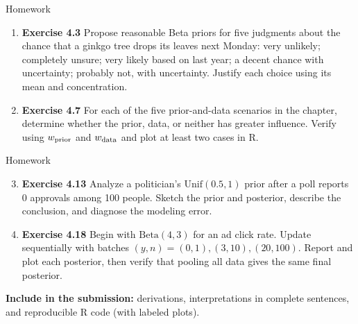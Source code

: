 \documentclass[aspectratio=43,11pt]{beamer}
\begin{document}
{
  
\begin{frame}{Homework}
\begin{enumerate}
  \item \textbf{Exercise 4.3} Propose reasonable Beta priors for five judgments about the chance that a ginkgo tree drops its leaves next Monday: very unlikely; completely unsure; very likely based on last year; a decent chance with uncertainty; probably not, with uncertainty. Justify each choice using its mean and concentration.
  \item \textbf{Exercise 4.7} For each of the five prior-and-data scenarios in the chapter, determine whether the prior, data, or neither has greater influence. Verify using $w_{\rm prior}$ and $w_{\rm data}$ and plot at least two cases in R.
\end{enumerate}
\end{frame}

\begin{frame}{Homework}
\begin{enumerate}\setcounter{enumi}{2}
  \item \textbf{Exercise 4.13} Analyze a politician's $\mathrm{Unif}(0.5,1)$ prior after a poll reports 0 approvals among 100 people. Sketch the prior and posterior, describe the conclusion, and diagnose the modeling error.
  \item \textbf{Exercise 4.18} Begin with $\mathrm{Beta}(4,3)$ for an ad click rate. Update sequentially with batches $(y,n)=(0,1),(3,10),(20,100)$. Report and plot each posterior, then verify that pooling all data gives the same final posterior.
\end{enumerate}
\vspace{.5em}
\textbf{Include in the submission:} derivations, interpretations in complete sentences, and reproducible R code (with labeled plots).
\end{frame}
}
\end{document}
